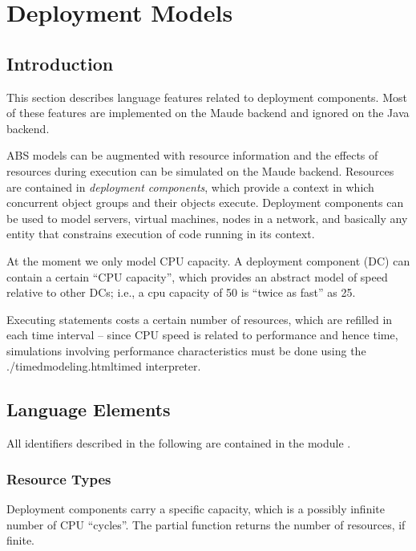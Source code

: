 \chapter{Deployment Models}\label{ch:resourcemodels}


\section{Introduction}

  This section describes language features related to deployment
  components.  Most of these features are implemented on the Maude
  backend and ignored on the Java backend.

  ABS models can be augmented with resource information and the effects
  of resources during execution can be simulated on the Maude backend.
  Resources are contained in \emph{deployment components}, which provide a
  context in which concurrent object groups and their objects execute.
  Deployment components can be used to model servers, virtual machines,
  nodes in a network, and basically any entity that constrains execution
  of code running in its context.

  At the moment we only model CPU capacity.  A deployment component (DC)
  can contain a certain ``CPU capacity'', which provides an abstract model
  of speed relative to other DCs; i.e., a cpu capacity of 50 is ``twice
  as fast'' as 25.

  Executing statements costs a certain number of resources, which are
  refilled in each time interval -- since CPU speed is related to
  performance and hence time, simulations involving performance
  characteristics must be done using the {{{./timedmodeling.html}timed
  interpreter}}.

\section{Language Elements}

  All identifiers described in the following are contained in the module
  .

\subsection{Resource Types}

   Deployment components carry a specific capacity, which is a possibly
   infinite number of CPU ``cycles''.  The partial function 
   returns the number of resources, if finite.

